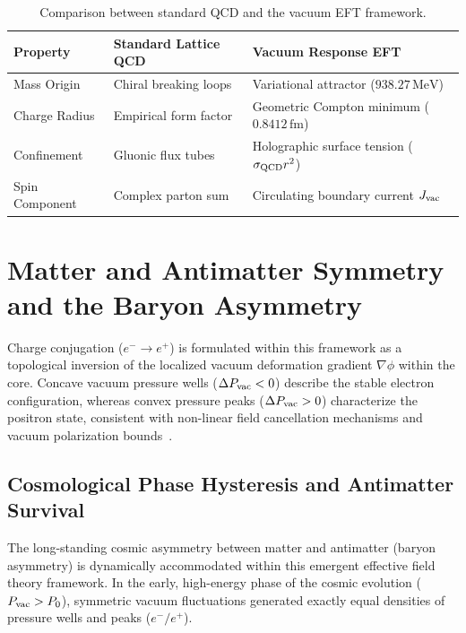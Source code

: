 \documentclass[
  reprint,
  aps,
  prd,
  twocolumn,
  superscriptaddress,
  nofootinbib,
  floatfix
]{revtex4-2}
\begin{document}
\begin{table}[!htbp]
\caption{Comparison between standard QCD and the vacuum EFT framework.}
\label{tab:proton_eft}
\centering
\begin{tabular}{lll}
\hline\hline
Property & Standard Lattice QCD & Vacuum Response EFT \\
\hline
Mass Origin & Chiral breaking loops & Variational attractor ($938.27\,\mathrm{MeV}$) \\
Charge Radius & Empirical form factor & Geometric Compton minimum ($0.8412\,\mathrm{fm}$) \\
Confinement & Gluonic flux tubes & Holographic surface tension ($\sigma_{\rm QCD} r^2$) \\
Spin Component & Complex parton sum & Circulating boundary current $J_{\rm vac}$ \\
\hline\hline
\end{tabular}
\end{table}



\section{Matter and Antimatter Symmetry and the Baryon Asymmetry}
\label{sec:matter_antimatter}

Charge conjugation ($e^{-} \rightarrow e^{+}$) is formulated 
within this framework as a topological inversion of the 
localized vacuum deformation gradient $\nabla\phi$ within 
the core. Concave vacuum pressure wells ($\Delta P_{\rm vac} 
< 0$) describe the stable electron configuration, whereas 
convex pressure peaks ($\Delta P_{\rm vac} > 0$) characterize 
the positron state, consistent with non-linear field 
cancellation mechanisms and vacuum polarization 
bounds~\cite{Schwinger1951}.


\subsection{Cosmological Phase Hysteresis and Antimatter Survival}
\label{sec:cosmic_hysteresis}

The long-standing cosmic asymmetry between matter and antimatter
(baryon asymmetry) is dynamically accommodated within this
emergent effective field theory framework. In the early,
high-energy phase of the cosmic evolution ($P_{\rm vac} > P_0$),
symmetric vacuum fluctuations generated exactly equal
densities of pressure wells and peaks ($e^{-}/e^{+}$).
\end{document}
